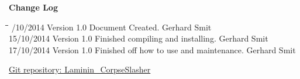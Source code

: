 \documentclass[letterpaper]{article}
\begin{document}
\begin{titlepage}
\begin{center}
\end{center}
\vfill %

\end{titlepage}
	\newpage
	{\LARGE \bf Change Log}\\[2em]
	
	\begin{tabbing}
			\hspace*{2.5cm}\=\hspace*{2.5cm}\=\hspace*{8cm}\=\hspace*{3cm} /10/2014\> Version 1.0\> Document Created. \> Gerhard Smit \\
			15/10/2014\> Version 1.0\> Finished compiling and installing. \> Gerhard Smit \\
			17/10/2014\> Version 1.0 \> Finished off how to use and maintenance.	\> Gerhard Smit	\\
	\end{tabbing}
	
		\newpage
		\renewcommand\contentsname{TABLE OF CONTENTS}
		\newcommand\contentsnameLC{\colorbox{black}{\makebox[\textwidth-2\fboxsep][l]{\bfseries\color{red} Table of Contents}}}
		
		\renewcommand{\cftdot}{}
		\hypersetup{linktocpage}
		\tableofcontents
		
		\begin{flushleft}
			\LARGE\href{https://github.com/njTaljaard/Laminin_CorpseSlasher/}{Git repository: Laminin\_CorpseSlasher}
		\end{flushleft}
		
	\newpage
		\section*{\colorbox{black}{}} 
	\vspace{0.1in}
	
\end{document}
